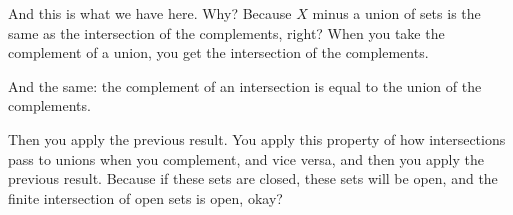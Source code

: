 \begin{content}
\end{content}

\begin{speech}[00:22:04 - 00:23:55]
And this is what we have here. Why? Because $X$ minus a union of sets  is the same as the intersection of the complements, right?  When you take the complement of a union, you get the intersection of the complements.

And the same: the complement of an intersection  is equal to the union of the complements. 

Then you apply the previous result. You apply this property of how intersections pass to unions when you complement, and vice versa, and then you apply the previous result. Because if these sets are closed, these sets will be open, and the finite intersection of open sets is open, okay?
\end{speech}

